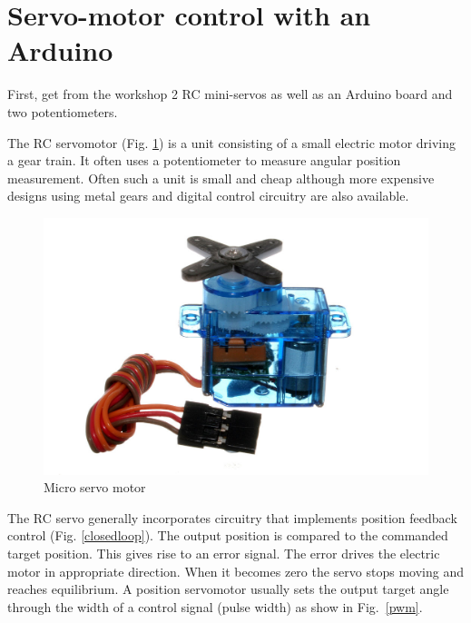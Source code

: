 \documentclass{instructions}
\begin{document}
\part{Servo-motor control with an Arduino}

 First, get from the workshop 2 RC mini-servos as well as an Arduino board and
two potentiometers.




The RC servomotor (Fig. \ref{servo}) is a unit consisting of a small electric
motor driving a gear train. It often uses a potentiometer to measure
angular position measurement. Often such a unit is small and cheap
although more expensive designs using metal gears and digital control
circuitry are also available.

\begin{figure}[h!]
    \centering
    \includegraphics[width=0.6\linewidth]{figs/servo1}
    \caption{Micro servo motor}
    \label{servo}
\end{figure}


The RC servo generally incorporates circuitry that implements position
feedback control (Fig. \ref{closedloop}). The output position is compared to the commanded
target position. This gives rise to an error signal. The error drives the
electric motor in appropriate direction. When it becomes zero the servo
stops moving and reaches equilibrium. A position servomotor usually
sets the output target angle through the width of a control signal (pulse width) as show in
Fig.~\ref{pwm}.
\end{document}
